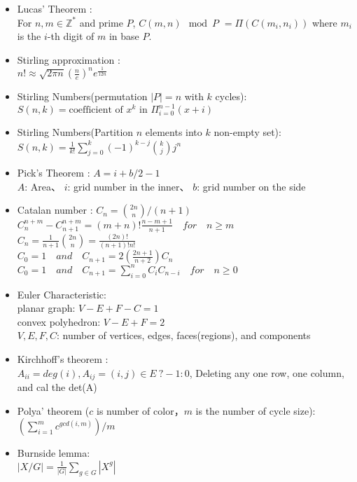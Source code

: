 \begin{itemize}
  \item Lucas’ Theorem :\\
    For $n, m \in \mathbb{Z}^{*}$ and prime $P$,
    $C(m,n) \mod P$
      $= \Pi ( C(m_i,n_i) )$
    where $m_i$ is the $i$-th digit of $m$ in base $P$.
  \item Stirling approximation : \\
    $n!\approx\sqrt{ 2 \pi n}(\frac{n}{e})^{n}e^\frac{1}{12n}$
  \item Stirling Numbers(permutation $|P|=n$ with $k$ cycles): \\
    $S(n,k) = \mbox{coefficient of }x^k \mbox{ in } \Pi_{i=0}^{n-1} (x+i)$
  \item Stirling Numbers(Partition $n$ elements into $k$ non-empty set): \\
    $S(n,k) = \frac{1}{k!} \sum\limits_{j=0}^k (-1)^{k-j} {k \choose j} j^n$
  \item Pick’s Theorem : $A = i + b/2 - 1$\\
    $A$: Area、 $i$: grid number in the inner、 $b$: grid number on the side
  \item Catalan number : $C_n = {2n \choose n}/(n+1)$\\
    $C^{n+m}_{n}-C^{n+m}_{n+1} = (m+n)! \frac{n-m+1}{n+1}\quad for \quad  n \ge m$\\
    $C_n = \frac{1}{n+1}{2n \choose n} = \frac{(2n)!}{(n+1)!n!}$\\
    $C_0 = 1 \quad  and \quad C_{n+1}= 2(\frac{2n+1}{n+2})C_n$\\
    $C_0 = 1 \quad  and \quad C_{n+1} = \sum_{i=0}^{n} C_iC_{n-i} \quad for \quad  n \ge 0$
  \item Euler Characteristic: \\
    planar graph: $V-E+F-C=1$ \\
    convex polyhedron: $V-E+F=2$ \\
    $V,E,F,C$: number of vertices, edges, faces(regions), and components
  \item Kirchhoff's theorem : \\
    $A_{ii} = deg(i), A_{ij} = (i,j) \in E\ ? -1 : 0$,
    Deleting any one row, one column, and cal the det(A)
  \item Polya' theorem ($c$ is number of color，$m$ is the number of cycle size): \\
    $(\sum_{i=1}^{m}{c^{gcd(i,m)}})/m$
  \item Burnside lemma: \\
    $|X/G| = \frac{1}{|G|}\sum\limits_{g\in G} |X^g|$

\end{itemize}
